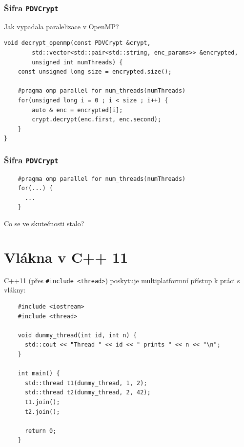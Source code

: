 \documentclass[usenames,dvipsnames,9pt]{beamer}
\begin{document}
{
\begin{frame}[fragile]
  \frametitle{Šifra \texttt{PDVCrypt}}
  Jak vypadala paralelizace v OpenMP?

    \begin{verbatim}
void decrypt_openmp(const PDVCrypt &crypt, 
        std::vector<std::pair<std::string, enc_params>> &encrypted,
        unsigned int numThreads) {
    const unsigned long size = encrypted.size();

    #pragma omp parallel for num_threads(numThreads)
    for(unsigned long i = 0 ; i < size ; i++) {
        auto & enc = encrypted[i];
        crypt.decrypt(enc.first, enc.second);
    }
}
    \end{verbatim}
    
\end{frame}
}

\begin{frame}[fragile]
  \frametitle{Šifra \texttt{PDVCrypt}}
  \begin{verbatim}
    #pragma omp parallel for num_threads(numThreads)
    for(...) {
      ...
    }
  \end{verbatim}
  
  \vspace{2em}

  \hfill\Large Co se ve skutečnosti stalo?    
\end{frame}

\section{Vlákna v C++ 11}

\begin{frame}[fragile]
  C++11 (přes \texttt{#include <thread>}) poskytuje multiplatformní přístup k práci s vlákny:

  \vspace{1em}

  \begin{verbatim}
    #include <iostream>
    #include <thread>

    void dummy_thread(int id, int n) {
      std::cout << "Thread " << id << " prints " << n << "\n";
    }

    int main() {
      std::thread t1(dummy_thread, 1, 2);
      std::thread t2(dummy_thread, 2, 42);
      t1.join();
      t2.join();

      return 0;
    }
  \end{verbatim}
\end{frame}
\end{document}

